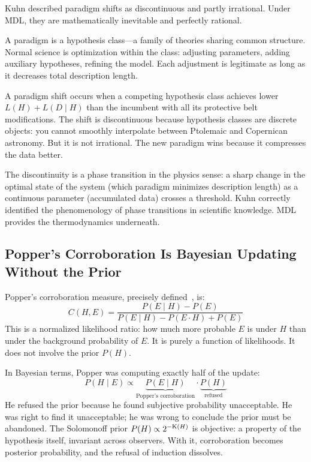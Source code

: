 Kuhn described paradigm shifts as discontinuous and partly irrational. Under
MDL, they are mathematically inevitable and perfectly rational.

A paradigm is a hypothesis class---a family of theories sharing common
structure. Normal science is optimization within the class: adjusting
parameters, adding auxiliary hypotheses, refining the model. Each adjustment
is legitimate as long as it decreases total description length.

A paradigm shift occurs when a competing hypothesis class achieves lower
$L(H) + L(D \mid H)$ than the incumbent with all its protective belt
modifications. The shift is discontinuous because hypothesis classes are
discrete objects: you cannot smoothly interpolate between Ptolemaic and
Copernican astronomy. But it is not irrational. The new paradigm wins because
it compresses the data better.

The discontinuity is a phase transition in the physics sense: a sharp change
in the optimal state of the system (which paradigm minimizes description
length) as a continuous parameter (accumulated data) crosses a threshold.
Kuhn correctly identified the phenomenology of phase transitions in
scientific knowledge. MDL provides the thermodynamics underneath.

\subsection{Popper's Corroboration Is Bayesian Updating Without the Prior}

Popper's corroboration measure, precisely defined~\cite{popper1954}, is:
\[
  C(H, E) = \frac{P(E \mid H) - P(E)}{P(E \mid H) - P(E \cdot H) + P(E)}
\]
This is a normalized likelihood ratio: how much more probable $E$ is under
$H$ than under the background probability of $E$. It is purely a function of
likelihoods. It does not involve the prior $P(H)$.

In Bayesian terms, Popper was computing exactly half of the update:
\[
  P(H \mid E) \propto \underbrace{P(E \mid H)}_{\text{Popper's corroboration}} \cdot \underbrace{P(H)}_{\text{refused}}
\]
He refused the prior because he found subjective probability unacceptable.
He was right to find it unacceptable; he was wrong to conclude the prior must
be abandoned. The Solomonoff prior $P(H) \propto 2^{-\mathrm{K}(H)}$ is objective:
a property of the hypothesis itself, invariant across observers. With it,
corroboration becomes posterior probability, and the refusal of induction
dissolves.


